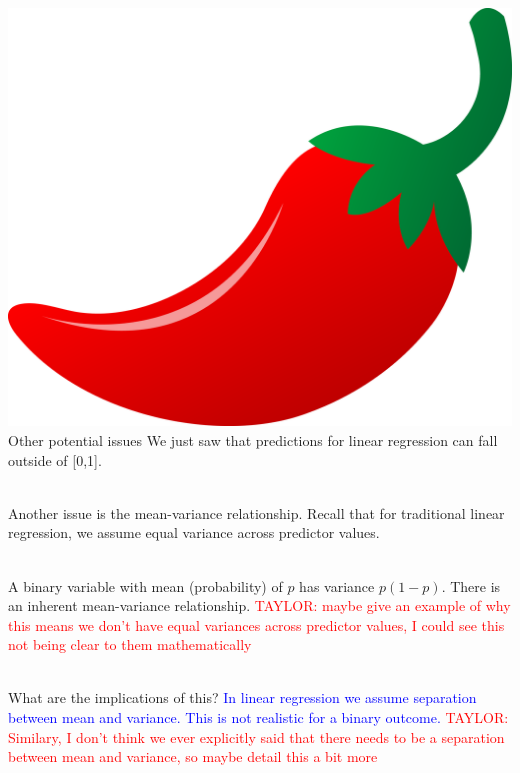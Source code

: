 \documentclass[10pt,t]{beamer}
\begin{document}
\begin{frame}{\includegraphics[scale=0.01]{./figs/chilipepper} Other potential issues}
	We just saw that predictions for linear regression can fall outside of [0,1]. 
	\\ ~\
	
	Another issue is the mean-variance relationship. Recall that for traditional linear regression, we assume equal variance across predictor values.
	\\ ~\ 
	
	A binary variable with mean (probability) of $p$ has variance $p(1-p)$. There is an inherent mean-variance relationship. \textcolor{red}{TAYLOR: maybe give an example of why this means we don't have equal variances across predictor values, I could see this not being clear to them mathematically}
	\\ ~\ 
	
	What are the implications of this? \textcolor{blue}{In linear regression we assume separation between mean and variance. This is not realistic for a binary outcome.} \textcolor{red}{TAYLOR: Similary, I don't think we ever explicitly said that there needs to be a separation between mean and variance, so maybe detail this a bit more}
\end{frame}
\end{document}
